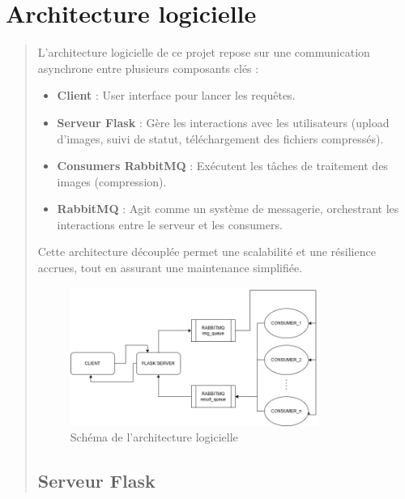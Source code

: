 \documentclass[12pt]{article}
\begin{document}
\newpage

\section{Architecture logicielle}
\begin{quote}
    L'architecture logicielle de ce projet repose sur une communication asynchrone entre plusieurs composants clés : \\

    \begin{itemize}
        \item \textbf{Client} : User interface pour lancer les requêtes.
        \item \textbf{Serveur Flask} : Gère les interactions avec les utilisateurs (upload d'images, suivi de statut, téléchargement des fichiers compressés).
        \item \textbf{Consumers RabbitMQ} : Exécutent les tâches de traitement des images (compression).
        \item \textbf{RabbitMQ} : Agit comme un système de messagerie, orchestrant les interactions entre le serveur et les consumers. \\
    \end{itemize}

Cette architecture découplée permet une scalabilité et une résilience accrues, tout en assurant une maintenance simplifiée.

\begin{figure}[h!]
    \centering
    \includegraphics[width=0.8\textwidth]{architecture_diagram.png}
    \caption{Schéma de l'architecture logicielle}
    \label{fig:architecture}
\end{figure}


\subsection{Serveur Flask}
\begin{quote}
    

\end{quote}
\end{quote}
\end{document}
